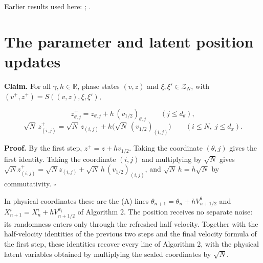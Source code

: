 \documentclass[11pt,a4paper]{article}
\begin{document}
Earlier results used here: \cite[Section~3.1.1]{LangevinLean2026IPLA}; \cite[Section~3.20.5]{LangevinLean2026Kinetic}.

\section{\texorpdfstring{The parameter and latent position updates}{The parameter and latent position updates}}


\textbf{Claim.} For all \(\gamma,h\in\mathbb R\), phase states \((v,z)\) and \(\xi,\xi'\in\mathcal Z_N\), with \((v^+,z^+)=S((v,z),\xi,\xi')\),


\[z^+_{\theta,j}=z_{\theta,j}+h\,(v_{1/2})_{\theta,j}\qquad(j\le d_\theta),\]
\[\sqrt N\,z^+_{(i,j)}=\sqrt N\,z_{(i,j)}+h\bigl(\sqrt N\,(v_{1/2})_{(i,j)}\bigr)\qquad(i\le N,\;j\le d_x).\]


\textbf{Proof.} By the first step, \(z^+=z+hv_{1/2}\). Taking the coordinate \((\theta,j)\) gives the first identity. Taking the coordinate \((i,j)\) and multiplying by \(\sqrt N\) gives \(\sqrt N z^+_{(i,j)}=\sqrt N z_{(i,j)}+\sqrt N\,h\,(v_{1/2})_{(i,j)}\), and \(\sqrt N\,h=h\sqrt N\) by commutativity. \(\square\)




In physical coordinates these are the (A) lines \(\theta_{n+1}=\theta_n+hV^\theta_{n+1/2}\) and \(X^i_{n+1}=X^i_n+hV^{x_i}_{n+1/2}\) of Algorithm 2. The position receives no separate noise: its randomness enters only through the refreshed half velocity. Together with the half-velocity identities of the previous two steps and the final velocity formula of the first step, these identities recover every line of Algorithm 2, with the physical latent variables obtained by multiplying the scaled coordinates by \(\sqrt N\).
\end{document}
